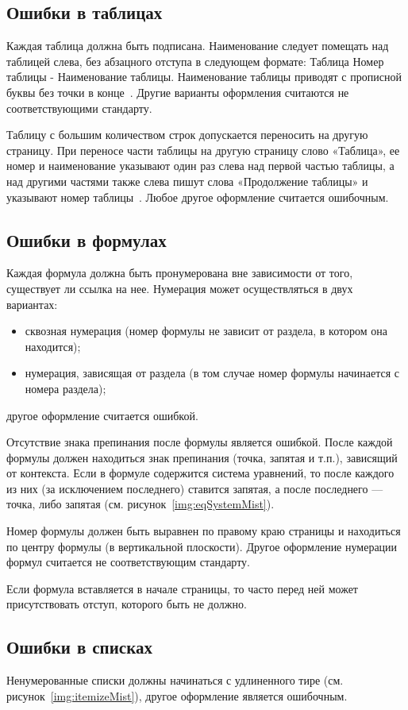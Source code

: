 \subsection{Ошибки в таблицах}
Каждая таблица должна быть подписана. Наименование следует помещать над таблицей слева, без абзацного отступа в следующем формате: Таблица Номер таблицы - Наименование таблицы. Наименование таблицы приводят с прописной буквы без точки в конце~\cite{GOST732}. Другие варианты оформления считаются не соответствующими стандарту.

Таблицу с большим количеством строк допускается переносить на другую страницу. При переносе части таблицы на другую страницу слово «Таблица», ее номер и наименование указывают один раз слева над первой частью таблицы, а над другими частями также слева пишут слова «Продолжение таблицы» и указывают номер таблицы~\cite{GOST732}. Любое другое оформление считается ошибочным.

\subsection{Ошибки в формулах}
Каждая формула должна быть пронумерована вне зависимости от того, существует ли ссылка на нее. Нумерация может осуществляться в двух вариантах:
\begin{itemize}
	\item сквозная нумерация (номер формулы не зависит от раздела, в котором она находится);
	\item нумерация, зависящая от раздела (в том случае номер формулы начинается с номера раздела);
\end{itemize}
другое оформление считается ошибкой.

Отсутствие знака препинания после формулы является ошибкой. После каждой формулы должен находиться знак препинания (точка, запятая и т.п.), зависящий от контекста. Если в формуле содержится система уравнений, то после каждого из них (за исключением последнего) ставится запятая, а после последнего --- точка, либо запятая (см. рисунок~\ref{img:eqSystemMist}).

Номер формулы должен быть выравнен по правому краю страницы и находиться по центру формулы (в вертикальной плоскости). Другое оформление нумерации формул считается не соответствующим стандарту.

Если формула вставляется в начале страницы, то часто перед ней может присутствовать отступ, которого быть не должно.

\subsection{Ошибки в списках}
Ненумерованные списки должны начинаться с удлиненного тире (см. рисунок~\ref{img:itemizeMist}), другое оформление является ошибочным.


